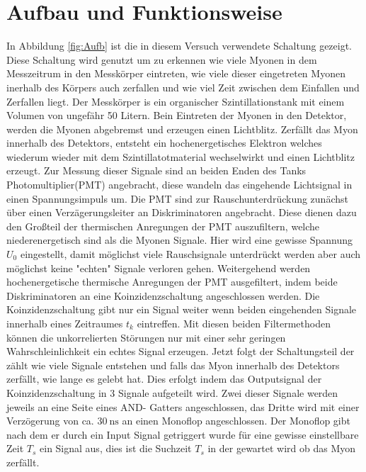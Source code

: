 \section{Aufbau und Funktionsweise}

    In Abbildung \ref{fig:Aufb} ist die in diesem Versuch verwendete Schaltung gezeigt.
    Diese Schaltung wird genutzt um zu erkennen wie viele Myonen in dem Messzeitrum in den Messkörper eintreten, wie viele dieser eingetreten Myonen inerhalb des Körpers auch zerfallen und wie viel Zeit zwischen dem Einfallen und Zerfallen liegt.
    Der Messkörper is ein organischer Szintillationstank mit einem Volumen von ungefähr 50 Litern.
    Bein Eintreten der Myonen in den Detektor, werden die Myonen abgebremst und erzeugen einen Lichtblitz.
    Zerfällt das Myon innerhalb des Detektors, entsteht ein hochenergetisches Elektron welches wiederum wieder mit dem Szintillatotmaterial wechselwirkt und einen Lichtblitz erzeugt.
    Zur Messung dieser Signale sind an beiden Enden des Tanks Photomultiplier(PMT) angebracht, diese wandeln das eingehende Lichtsignal in einen Spannungsimpuls um. 
    Die PMT sind zur Rauschunterdrückung zunächst über einen Verzägerungsleiter an Diskriminatoren angebracht.
    Diese dienen dazu den Großteil der thermischen Anregungen der PMT auszufiltern, welche niederenergetisch sind als die Myonen Signale.
    Hier wird eine gewisse Spannung $U_0$ eingestellt, damit möglichst viele Rauschsignale unterdrückt werden aber auch möglichst keine "echten" Signale verloren gehen.
    Weitergehend werden hochenergetische thermische Anregungen der PMT ausgefiltert, indem beide Diskriminatoren an eine Koinzidenzschaltung angeschlossen werden.
    Die Koinzidenzschaltung gibt nur ein Signal weiter wenn beiden eingehenden Signale innerhalb eines Zeitraumes $t_k$ eintreffen. 
    Mit diesen beiden Filtermethoden können die unkorrelierten Störungen nur mit einer sehr geringen Wahrschleinlichkeit ein echtes Signal erzeugen.
    Jetzt folgt der Schaltungsteil der zählt wie viele Signale entstehen und falls das Myon innerhalb des Detektors zerfällt, wie lange es gelebt hat.
    Dies erfolgt indem das Outputsignal der Koinzidenzschaltung in 3 Signale aufgeteilt wird.
    Zwei dieser Signale werden jeweils an eine Seite eines AND- Gatters angeschlossen, das Dritte wird mit einer Verzögerung von ca. $\SI{30}{\nano\second}$ an einen Monoflop angeschlossen.
    Der Monoflop gibt nach dem er durch ein Input Signal getriggert wurde für eine gewisse einstellbare Zeit $T_s$ ein Signal aus, dies ist die Suchzeit $T_s$ in der gewartet wird ob das Myon zerfällt.
